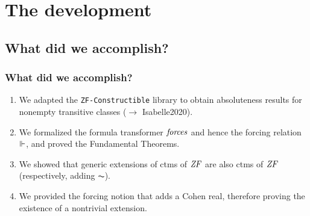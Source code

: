 \documentclass[english]{beamer}
\begin{document}

\section{The development}

\subsection{What did we accomplish?}

\begin{frame}
  \frametitle{What did we accomplish?}
  \begin{shadowblock}{}
    \begin{enumerate}
    \item<1-> We adapted the \texttt{ZF-Constructible} library
      \citep{paulson_2003} to obtain
      absoluteness results for nonempty transitive classes ($\to$
      \alert{Isabelle2020}).
    \item<2-> We formalized the formula transformer $\mathit{forces}$ and
      hence the forcing relation $\Vdash$, and proved the Fundamental
      Theorems.
    \item<3-> We showed that generic extensions of ctms of $\mathit{ZF}$ are also
      ctms of $\mathit{ZF}$ (respectively, adding $\AC$).
    \item<4-> We provided the forcing notion that adds a Cohen real,
      therefore proving the existence of a nontrivial extension.
    \end{enumerate}
  \end{shadowblock}
\end{frame}
\end{document}
